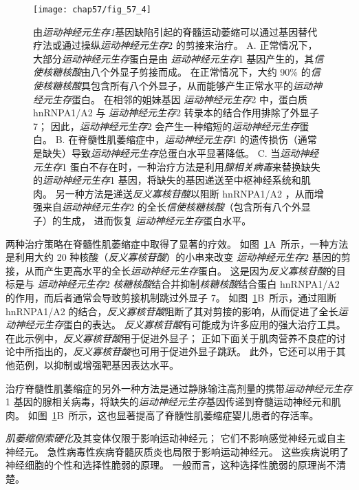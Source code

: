 \begin{figure}[htbp]
	\centering
	\texttt{[image: chap57/fig\_57\_4]}
	\caption{由\textit{运动神经元生存1}基因缺陷引起的脊髓运动萎缩可以通过基因替代疗法或通过操纵\textit{运动神经元生存}2 的剪接来治疗。
		A. 正常情况下，大部分\textit{运动神经元生存}蛋白是由 \textit{运动神经元生存}1 基因产生的，其\textit{信使核糖核酸}由八个外显子剪接而成。
		在正常情况下，大约 90\% 的\textit{信使核糖核酸}具包含所有八个外显子，从而能够产生正常水平的\textit{运动神经元生存}蛋白。
		在相邻的姐妹基因 \textit{运动神经元生存}2 中，蛋白质 hnRNPA1/A2 与 \textit{运动神经元生存}2 转录本的结合作用排除了外显子 7；
		因此，\textit{运动神经元生存}2 会产生一种缩短的\textit{运动神经元生存}蛋白。
		B. 在脊髓性肌萎缩症中，\textit{运动神经元生存}1 的遗传损伤（通常是缺失）导致\textit{运动神经元生存}总蛋白水平显著降低。
		C. 当\textit{运动神经元生存}1 蛋白不存在时，一种治疗方法是利用\textit{腺相关病毒}来替换缺失的\textit{运动神经元生存}1 基因，将缺失的基因递送至中枢神经系统和肌肉。
		另一种方法是递送\textit{反义寡核苷酸}以阻断 hnRNPA1/A2 ，从而增强来自\textit{运动神经元生存}2 的全长\textit{信使核糖核酸}（包含所有八个外显子）的生成，
		进而恢复 \textit{运动神经元生存}蛋白水平。}
	\label{fig:57_4}
\end{figure}


两种治疗策略在脊髓性肌萎缩症中取得了显著的疗效。
如图~\ref{fig:57_4}A~所示，一种方法是利用大约 20 种核酸（\textit{反义寡核苷酸}）的小串来改变 \textit{运动神经元生存}2 基因的剪接，从而产生更高水平的全长\textit{运动神经元生存}蛋白。
这是因为\textit{反义寡核苷酸}的目标是与 \textit{运动神经元生存}2 \textit{核糖核酸}结合并抑制\textit{核糖核酸}结合蛋白 hnRNPA1/A2 的作用，而后者通常会导致剪接机制跳过外显子 7。
如图~\ref{fig:57_4}B~所示，通过阻断 hnRNPA1/A2 的结合，\textit{反义寡核苷酸}阻断了其对剪接的影响，从而促进了全长\textit{运动神经元生存}蛋白的表达。
\textit{反义寡核苷酸}有可能成为许多应用的强大治疗工具。
在此示例中，\textit{反义寡核苷酸}用于促进外显子；
正如下面关于肌肉营养不良症的讨论中所指出的，\textit{反义寡核苷酸}也可用于促进外显子跳跃。
此外，它还可以用于其他范例，以抑制或增强靶基因表达水平。


治疗脊髓性肌萎缩症的另外一种方法是通过静脉输注高剂量的携带\textit{运动神经元生存}1 基因的腺相关病毒，将缺失的\textit{运动神经元生存}基因传递到脊髓运动神经元和肌肉。
如图~\ref{fig:57_4}B~所示，这也显著提高了脊髓性肌萎缩症婴儿患者的存活率。


\textit{肌萎缩侧索硬化}及其变体仅限于影响运动神经元；
它们不影响感觉神经元或自主神经元。
急性病毒性疾病脊髓灰质炎也局限于影响运动神经元。
这些疾病说明了神经细胞的个性和选择性脆弱的原理。
一般而言，这种选择性脆弱的原理尚不清楚。



